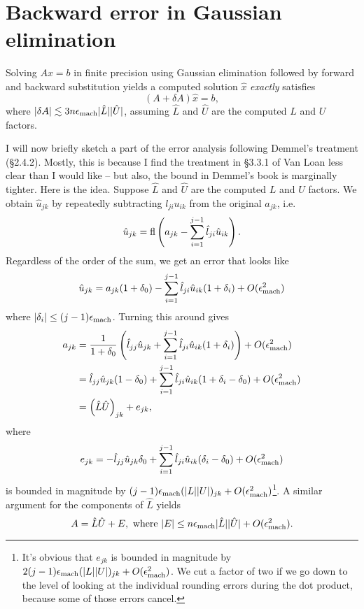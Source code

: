 \documentclass[12pt, leqno]{article} %
\begin{document}
\section{Backward error in Gaussian elimination}

Solving $Ax = b$ in finite precision using Gaussian elimination
followed by forward and backward substitution yields a computed
solution $\hat{x}$ {\em exactly} satisfies
\begin{equation} \label{gauss-bnd}
  (A + \delta A) \hat{x} = b,
\end{equation}
where $|\delta A| \lesssim 3n\epsilon_{\mathrm{mach}} |\hat{L}| |\hat{U}|$, assuming
$\hat{L}$ and $\hat{U}$ are the computed $L$ and $U$ factors.

I will now briefly sketch a part of the error analysis following
Demmel's treatment (\S 2.4.2).  Mostly, this is because I find the
treatment in \S 3.3.1 of Van Loan less clear than I would like -- but
also, the bound in Demmel's book is marginally tighter.  Here is the
idea.  Suppose $\hat{L}$ and $\hat{U}$ are the computed $L$ and $U$
factors.  We obtain $\hat{u}_{jk}$ by repeatedly subtracting $l_{ji}
u_{ik}$ from the original $a_{jk}$, i.e.
\[
  \hat{u}_{jk} =
    \operatorname{fl}\left( a_{jk} - \sum_{i=1}^{j-1} \hat{l}_{ji} \hat{u}_{ik} \right).
\]
Regardless of the order of the sum, we get an error that looks like
\[
  \hat{u}_{jk} = a_{jk}(1+\delta_0) -
                 \sum_{i=1}^{j-1} \hat{l}_{ji} \hat{u}_{ik} (1+\delta_i) +
                 O(\epsilon_{\mathrm{mach}}^2)
\]
where $|\delta_i| \leq (j-1) \epsilon_{\mathrm{mach}}$.  Turning this around gives
\begin{align*}
  a_{jk} & =
  \frac{1}{1+\delta_0} \left(
    \hat{l}_{jj} \hat{u}_{jk} +
    \sum_{i=1}^{j-1} \hat{l}_{ji} \hat{u}_{ik} (1 + \delta_i)
  \right) + O(\epsilon_{\mathrm{mach}}^2) \\
  & =
    \hat{l}_{jj} \hat{u}_{jk} (1 - \delta_0) +
    \sum_{i=1}^{j-1} \hat{l}_{ji} \hat{u}_{ik} (1 + \delta_i - \delta_0) +
    O(\epsilon_{\mathrm{mach}}^2) \\
  & =
    \left( \hat{L} \hat{U} \right)_{jk} + e_{jk},
\end{align*}
where
\[
   e_{jk} =
    -\hat{l}_{jj} \hat{u}_{jk} \delta_0 +
    \sum_{i=1}^{j-1} \hat{l}_{ji} \hat{u}_{ik} (\delta_i - \delta_0) +
    O(\epsilon_{\mathrm{mach}}^2)
\]
is bounded in magnitude by $(j-1) \epsilon_{\mathrm{mach}} (|L||U|)_{jk} + O(\epsilon_{\mathrm{mach}}^2)$\footnote{
  It's obvious that $e_{jk}$ is bounded in magnitude by $2(j-1)
  \epsilon_{\mathrm{mach}}(|L||U|)_{jk} + O(\epsilon_{\mathrm{mach}}^2)$.  We cut a factor of two if
  we go down to the level of looking at the individual rounding errors
  during the dot product, because some of those errors cancel.
}.
A similar argument for the components of $\hat{L}$ yields
\[
  A = \hat{L} \hat{U} + E, \mbox{ where }
  |E| \leq n \epsilon_{\mathrm{mach}} |\hat{L}| |\hat{U}| + O(\epsilon_{\mathrm{mach}}^2).
\]
\end{document}
